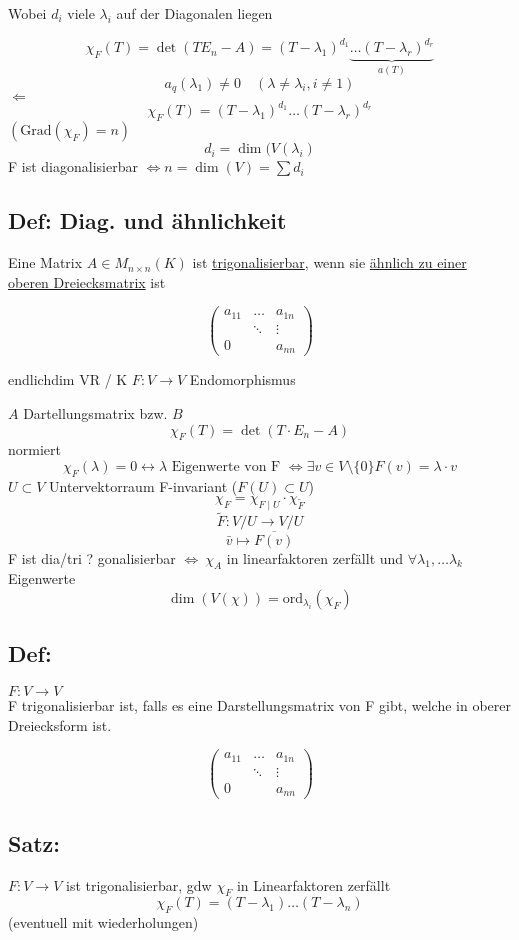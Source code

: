 \documentclass[titlepage,12pt,a4paper,ngerman]{report}
\newcommand{\tx}[1]{\textrm{#1}}
\newcommand{\ov}[1]{\overline{#1}}
\newcommand{\ub}[1]{\underbrace{#1}}
\begin{document}
Wobei $d_i$ viele $ \lambda_i $ auf der Diagonalen liegen

$$\chi_F(T) = \det(T E_n - A) = (T-\lambda_1)^{d_1} \ub{\dots (T-\lambda_r)^{d_r}}_{a(T)}$$
$$a_q(\lambda_1) \neq 0 \quad (\lambda\neq \lambda_i , i \neq 1)$$
$ \Leftarrow$
$$\chi_F(T) = (T-\lambda_1)^{d_1} \dots (T-\lambda_r)^{d_r}$$
$(\tx{Grad}(\chi_F) = n)$
$$d_i = \dim(V(\lambda_i)$$
F ist diagonalisierbar $\Leftrightarrow n = \dim(V) = \sum d_i$


\subsection{Def: Diag. und ähnlichkeit} Eine Matrix $A \in M_{n\times n} (K)$ ist \underline{trigonalisierbar}, wenn sie \underline{ähnlich zu einer} \underline{oberen Dreiecksmatrix} ist 

$$\begin{pmatrix}
a_{11} & \dots & a_{1n} \\
& \ddots & \vdots\\
0 & & a_{nn}
\end{pmatrix}$$



endlichdim VR / K
$F: V \to V $ Endomorphismus

$ A $ Dartellungsmatrix bzw. $B$
$$ \chi_F (T) = \det (T\cdot E_n - A)$$
normiert
$$\chi_F(\lambda) = 0 \leftrightarrow \lambda \textrm{ Eigenwerte von F } \Leftrightarrow \exists v\in V\setminus \{0\} F(v) = \lambda \cdot v$$
$U \subset V$ Untervektorraum F-invariant ($F(U) \subset U$)
$$\chi_F = \chi_{F \mid U} \cdot \chi_{\tilde{F}}$$
$$ \tilde{F}: V/U \to V/U$$
$$\bar{v} \mapsto \ov{F(v)}$$
F ist dia/tri ? gonalisierbar $\Leftrightarrow \ \chi_A$ in linearfaktoren zerfällt und $\forall \lambda_1, \dots \lambda_k$ Eigenwerte
$$\dim(V(\chi)) = \textrm{ord}_{\lambda_i}(\chi_F)$$
\subsection{Def:}
$F: V\to V $\\
F trigonalisierbar ist, falls es eine Darstellungsmatrix von F gibt, welche in oberer Dreiecksform ist.

$$\begin{pmatrix}
a_{11} & \dots & a_{1n} \\
& \ddots & \vdots\\
0 & & a_{nn}
\end{pmatrix}$$

\subsection{Satz:}
$F: V\to V $
ist trigonalisierbar, gdw $\chi_F$ in Linearfaktoren zerfällt 
$$\chi_F(T) = (T-\lambda_1) \dots (T-\lambda_n)$$
(eventuell mit wiederholungen)
\end{document}
